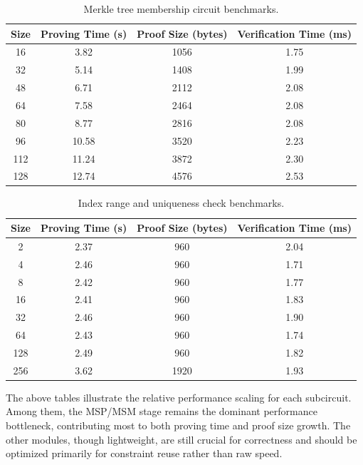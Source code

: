 \documentclass{article}
\begin{document}
\begin{table}[h]
\centering
\small
\begin{tabular}{cccc}
\toprule
\textbf{Size} & \textbf{Proving Time (s)} & \textbf{Proof Size (bytes)} & \textbf{Verification Time (ms)} \\
\midrule
16 & 3.82 & 1056 & 1.75 \\
32 & 5.14 & 1408 & 1.99 \\
48 & 6.71 & 2112 & 2.08 \\
64 & 7.58 & 2464 & 2.08 \\
80 & 8.77 & 2816 & 2.08 \\
96 & 10.58 & 3520 & 2.23 \\
112 & 11.24 & 3872 & 2.30 \\
128 & 12.74 & 4576 & 2.53 \\
\bottomrule
\end{tabular}
\caption{Merkle tree membership circuit benchmarks.}
\label{tab:merkle-detailed}
\end{table}

\begin{table}[h]
\centering
\small
\begin{tabular}{cccc}
\toprule
\textbf{Size} & \textbf{Proving Time (s)} & \textbf{Proof Size (bytes)} & \textbf{Verification Time (ms)} \\
\midrule
2 & 2.37 & 960 & 2.04 \\
4 & 2.46 & 960 & 1.71 \\
8 & 2.42 & 960 & 1.77 \\
16 & 2.41 & 960 & 1.83 \\
32 & 2.46 & 960 & 1.90 \\
64 & 2.43 & 960 & 1.74 \\
128 & 2.49 & 960 & 1.82 \\
256 & 3.62 & 1920 & 1.93 \\
\bottomrule
\end{tabular}
\caption{Index range and uniqueness check benchmarks.}
\label{tab:indexcheck-detailed}
\end{table}

\noindent
The above tables illustrate the relative performance scaling for each subcircuit. Among them, the MSP/MSM stage remains the dominant performance bottleneck, contributing most to both proving time and proof size growth. The other modules, though lightweight, are still crucial for correctness and should be optimized primarily for constraint reuse rather than raw speed.
\end{document}
